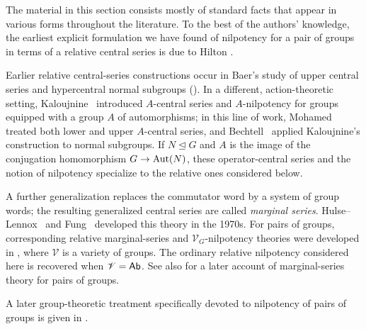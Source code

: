 \begin{HisNote}
The material in this section consists mostly of standard facts that appear in various forms throughout the literature. 
To the best of the authors' knowledge, the earliest explicit formulation we have found of nilpotency for a pair of groups in terms of a relative central series is due to Hilton \cite{hilton_1976_nilpotency_in_group_theory_and_topology,hilton_1982_nilpotency_in_group_theory_and_topology}.

Earlier relative central-series constructions occur in Baer's study of upper central series and hypercentral normal subgroups (\cite{baer_1953_the_hypercenter_of_a_group}). In a different, action-theoretic setting, Kaloujnine~\cite{kaloujnine_1953_uber_gewisse_beziehungen_zwischen_einer_gruppe_und_ihren_automorphismen} introduced $A$-central series and $A$-nilpotency for groups equipped with a group $A$ of automorphisms; in this line of work, Mohamed~\cite{mohamed_1963_on_series_of_subgroups_related_to_groups_of_automorphisms} treated both lower and upper $A$-central series, and Bechtell~\cite{bechtell_1966_frattini_subgroups_and_phi_central_groups} applied Kaloujnine's construction to normal subgroups.
If $N\trianglelefteq G$ and $A$ is the image of the conjugation homomorphism $G\to\operatorname{Aut}(N)$, these operator-central series and the notion of nilpotency specialize to the relative ones considered below.

A further generalization replaces the commutator word by a system of group words; the resulting generalized central series are called \emph{marginal series}. Hulse--Lennox~\cite{hulse_lennox_1976_marginal_series_in_groups} and Fung~\cite{fung_1977_some_theorems_of_hall_type} developed this theory in the 1970s.
For pairs of groups, corresponding relative marginal-series and $\mathscr{V}_G$-nilpotency theories were developed in \cite{moghaddam_salemkar_2002_some_properties_of_ultra_hall_and_schur_pairs,rismanchian_araskhan_2013_some_properties_on_the_baerinvariant_of_a_pair_of_groups_and_mathscrvgmarginal_series}, where $\mathscr{V}$ is a variety of groups. The ordinary relative nilpotency considered here is recovered when $\mathscr{V}=\mathsf{Ab}$. See also \cite{rismanchian_2021_group_extensions_and_marginal_series_of_pair_of_groups} for a later account of marginal-series theory for pairs of groups.

A later group-theoretic treatment specifically devoted to nilpotency of pairs of groups is given in \cite{hassanzadeh_pourmirzaei_kayvanfar_2013_on_the_nilpotency_of_a_pair_of_groups}.
\end{HisNote}


